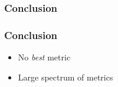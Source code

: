 
\begin{frame}
  \frametitle{Conclusion}
\end{frame}

\begin{frame}
  \frametitle{Conclusion}
  \begin{itemize}
    \item No \textit{best} metric
    \item Large spectrum of metrics
  \end{itemize}
\end{frame}